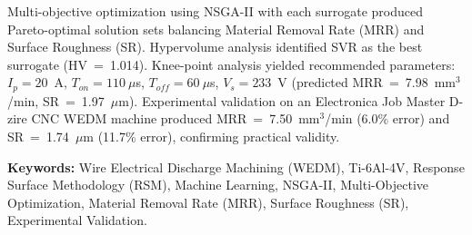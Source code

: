 \documentclass[12pt, a4paper]{report}
\begin{document}
Multi-objective optimization using NSGA-II with each surrogate produced Pareto-optimal solution sets balancing Material Removal Rate (MRR) and Surface Roughness (SR). Hypervolume analysis identified SVR as the best surrogate (HV~=~1.014). Knee-point analysis yielded recommended parameters: $I_p = 20$~A, $T_{on} = 110~\mu$s, $T_{off} = 60~\mu$s, $V_s = 233$~V (predicted MRR~=~7.98~mm$^3$/min, SR~=~1.97~$\mu$m). Experimental validation on an Electronica Job Master D-zire CNC WEDM machine produced MRR~=~7.50~mm$^3$/min (6.0\% error) and SR~=~1.74~$\mu$m (11.7\% error), confirming practical validity.

\vspace{0.3cm}
\textbf{Keywords:} Wire Electrical Discharge Machining (WEDM), Ti-6Al-4V, Response Surface Methodology (RSM), Machine Learning, NSGA-II, Multi-Objective Optimization, Material Removal Rate (MRR), Surface Roughness (SR), Experimental Validation.

{
\setlength{\parskip}{0pt}
\tableofcontents
}

\clearpage
{}

\end{document}
